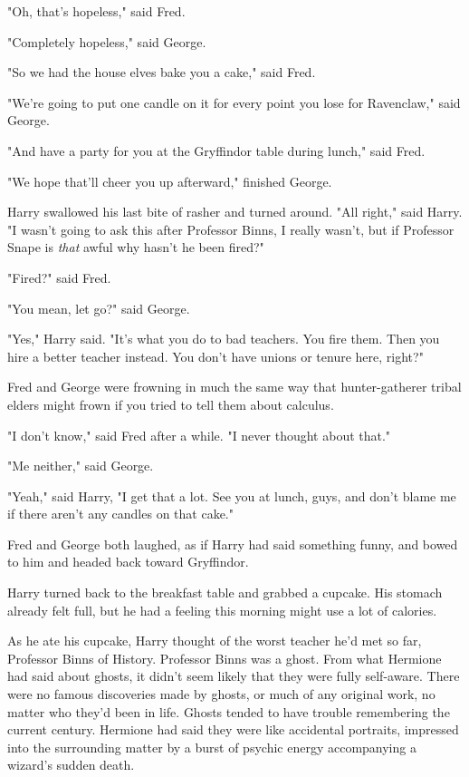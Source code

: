 "Oh, that's hopeless," said Fred.

"Completely hopeless," said George.

"So we had the house elves bake you a cake," said Fred.

"We're going to put one candle on it for every point you lose for Ravenclaw," 
said George.

"And have a party for you at the Gryffindor table during lunch," said Fred.

"We hope that'll cheer you up afterward," finished George.

Harry swallowed his last bite of rasher and turned around. "All right," said 
Harry. "I wasn't going to ask this after Professor Binns, I really wasn't, but 
if Professor Snape is \emph{that} awful why hasn't he been fired?"

"Fired?" said Fred.

"You mean, let go?" said George.

"Yes," Harry said. "It's what you do to bad teachers. You fire them. Then you 
hire a better teacher instead. You don't have unions or tenure here, right?"

Fred and George were frowning in much the same way that hunter-gatherer tribal 
elders might frown if you tried to tell them about calculus.

"I don't know," said Fred after a while. "I never thought about that."

"Me neither," said George.

"Yeah," said Harry, "I get that a lot. See you at lunch, guys, and don't blame 
me if there aren't any candles on that cake."

Fred and George both laughed, as if Harry had said something funny, and bowed 
to him and headed back toward Gryffindor.

Harry turned back to the breakfast table and grabbed a cupcake. His stomach 
already felt full, but he had a feeling this morning might use a lot of 
calories.

As he ate his cupcake, Harry thought of the worst teacher he'd met so far, 
Professor Binns of History. Professor Binns was a ghost. From what Hermione had 
said about ghosts, it didn't seem likely that they were fully self-aware. There 
were no famous discoveries made by ghosts, or much of any original work, no 
matter who they'd been in life. Ghosts tended to have trouble remembering the 
current century. Hermione had said they were like accidental portraits, 
impressed into the surrounding matter by a burst of psychic energy accompanying 
a wizard's sudden death.

